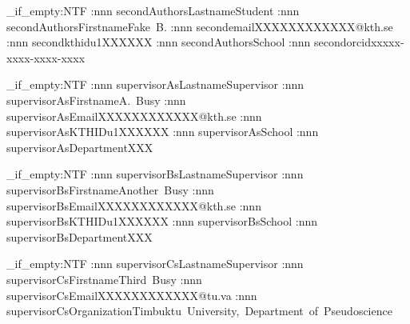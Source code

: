 {    
    \tl_if_empty:NTF \@secondAuthorsLastname
    { %
    }
    { %
    \kth@check@value:nnn {secondAuthorsLastname}{\@secondAuthorsLastname}{Student}
    \kth@check@value:nnn {secondAuthorsFirstname}{\@secondAuthorsFirstname}{Fake~B.}
    \kth@check@value:nnn {secondemail}{\@secondemail}{XXXXXXXXXXXX@kth.se}
    \kth@check@value:nnn {secondkthid}{\@secondkthid}{u1XXXXXX}
    \kth@check@value:nnn {secondAuthorsSchool}{\@secondAuthorsSchool}{}
    \kth@check@value:nnn {secondorcid}{\@secondorcid}{xxxxx-xxxx-xxxx-xxxx}
    }

    \tl_if_empty:NTF \@supervisorAsLastname
    { %
    }
    { %
    \kth@check@value:nnn {supervisorAsLastname}{\@supervisorAsLastname}{Supervisor}
    \kth@check@value:nnn {supervisorAsFirstname}{\@supervisorAsFirstname}{A.~Busy}
    \kth@check@value:nnn {supervisorAsEmail}{\@supervisorAsEmail}{XXXXXXXXXXXX@kth.se}
    \kth@check@value:nnn {supervisorAsKTHID}{\@supervisorAsKTHID}{u1XXXXXX}
    \kth@check@value:nnn {supervisorAsSchool}{\@supervisorAsSchool}{}
    \kth@check@value:nnn {supervisorAsDepartment}{\@supervisorAsDepartment}{XXX}
    }
    
    \tl_if_empty:NTF \@supervisorBsLastname
    { %
    }
    { %
    \kth@check@value:nnn {supervisorBsLastname}{\@supervisorBsLastname}{Supervisor}
    \kth@check@value:nnn {supervisorBsFirstname}{\@supervisorBsFirstname}{Another~Busy}
    \kth@check@value:nnn {supervisorBsEmail}{\@supervisorBsEmail}{XXXXXXXXXXXX@kth.se}
    \kth@check@value:nnn {supervisorBsKTHID}{\@supervisorBsKTHID}{u1XXXXXX}
    \kth@check@value:nnn {supervisorBsSchool}{\@supervisorBsSchool}{}
    \kth@check@value:nnn {supervisorBsDepartment}{\@supervisorBsDepartment}{XXX}
    }

    \tl_if_empty:NTF \@supervisorCsLastname
    { %
    }
    { %
    \kth@check@value:nnn {supervisorCsLastname}{\@supervisorCsLastname}{Supervisor}
    \kth@check@value:nnn {supervisorCsFirstname}{\@supervisorCsFirstname}{Third~Busy}
    \kth@check@value:nnn {supervisorCsEmail}{\@supervisorCsEmail}{XXXXXXXXXXXX@tu.va}
    \kth@check@value:nnn {supervisorCsOrganization}{\@supervisorCsOrganization}{Timbuktu~University,~Department~of~Pseudoscience}
    }

}
